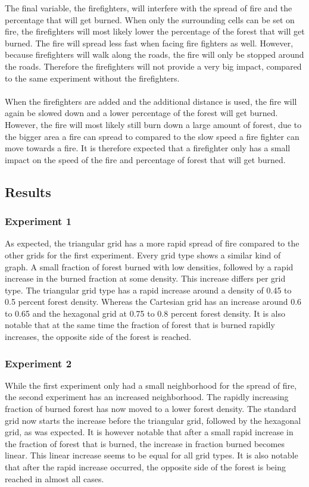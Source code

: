 \documentclass{article}
\begin{document}
\begin{multicols}{2}
The final variable, the firefighters, will interfere with the spread of fire and the percentage that will get burned. When only the surrounding cells can be set on fire, the firefighters will most likely lower the percentage of the forest that will get burned. The fire will spread less fast when facing fire fighters as well. However, because firefighters will walk along the roads, the fire will only be stopped around the roads. Therefore the firefighters will not provide a very big impact, compared to the same experiment without the firefighters.\\\\
When the firefighters are added and the additional distance is used, the fire will again be slowed down and a lower percentage of the forest will get burned. However, the fire will most likely still burn down a large amount of forest, due to the bigger area a fire can spread to compared to the slow speed a fire fighter can move towards a fire. It is therefore expected that a firefighter only has a small impact on the speed of the fire and percentage of forest that will get burned.


\subsection*{Results}
\subsubsection*{Experiment 1}
As expected, the triangular grid has a more rapid spread of fire compared to the other grids for the first experiment. Every grid type shows a similar kind of graph. A small fraction of forest burned with low densities, followed by a rapid increase in the burned fraction at some density. This increase differs per grid type. The triangular grid type has a rapid increase around a density of 0.45 to 0.5 percent forest density. Whereas the Cartesian grid has an increase around 0.6 to 0.65 and the hexagonal grid at 0.75 to 0.8 percent forest density. It is also notable that at the same time the fraction of forest that is burned rapidly increases, the opposite side of the forest is reached.
\subsubsection*{Experiment 2}
While the first experiment only had a small neighborhood for the spread of fire, the second experiment has an increased neighborhood. The rapidly increasing fraction of burned forest has now moved to a lower forest density. The standard grid now starts the increase before the triangular grid, followed by the hexagonal grid, as was expected. It is however notable that after a small rapid increase in the fraction of forest that is burned, the increase in fraction burned becomes linear. This linear increase seems to be equal for all grid types. It is also notable that after the rapid increase occurred, the opposite side of the forest is being reached in almost all cases.

\end{multicols}
\end{document}
